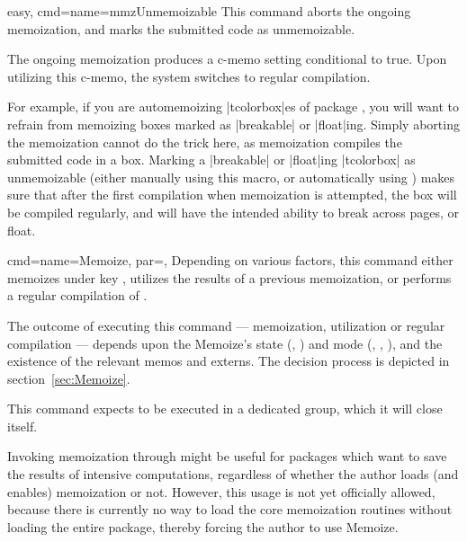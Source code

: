 \documentclass[a4paper,11pt]{article}
\begin{document}
\begin{doc}{easy, cmd={name=mmzUnmemoizable}}
  This command aborts the ongoing memoization, and marks the submitted code as
  unmemoizable.

  The ongoing memoization produces a c-memo setting conditional
   to true.  Upon utilizing this c-memo, the
  system switches to regular compilation.

  For example, if you are automemoizing |tcolorbox|es of package
  , you will want to refrain from memoizing boxes marked as
  |breakable| or |float|ing.  Simply aborting the memoization cannot do the
  trick here, as memoization compiles the submitted code in a  box.
  Marking a |breakable| or |float|ing |tcolorbox| as unmemoizable (either
  manually using this macro, or automatically using ) makes
  sure that after the first compilation when memoization is attempted, the box
  will be compiled regularly, and will have the intended ability to break
  across pages, or float.
\end{doc}


\begin{doc}{
    cmd={name=Memoize, par=},
  }
  Depending on various factors, this command either memoizes  under
  key , utilizes the results of a previous memoization, or performs a
  regular compilation of .

  The outcome of executing this command --- memoization, utilization or regular
  compilation --- depends upon the Memoize's state (,
  ) and mode (, ,
  ), and the existence of the relevant memos and externs.
  The decision process is depicted in section~\ref{sec:Memoize}.

  This command expects to be executed in a dedicated group, which it will close
  itself.

  Invoking memoization through  might be useful for packages
  which want to save the results of intensive computations, regardless of
  whether the author loads (and enables) memoization or not.  However, this
  usage is not yet officially allowed, because there is currently no way to
  load the core memoization routines without loading the entire package,
  thereby forcing the author to use Memoize.
\end{doc}
\end{document}
